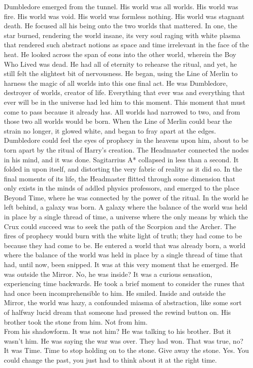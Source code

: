 Dumbledore emerged from the tunnel. His world was all worlds. His world was fire. His world was void. His world was formless nothing. His world was stagnant death. He focused all his being onto the two worlds that mattered. In one, the star burned, rendering the world insane, its very soul raging with white plasma that rendered such abstract notions as space and time irrelevant in the face of the heat.
\SmallVSpace
He looked across the span of eons into the other world, wherein the Boy Who Lived was dead.
\SmallVSpace
He had all of eternity to rehearse the ritual, and yet, he still felt the slightest bit of nervousness. He began, using the Line of Merlin to harness the magic of all worlds into this one final act. He was Dumbledore, destroyer of worlds, creator of life. Everything that ever was and everything that ever will be in the universe had led him to this moment. This moment that must come to pass because it already has.
\SomeVSpace
All worlds had narrowed to two, and from those two all worlds would be born. When the Line of Merlin could bear the strain no longer, it glowed white, and began to fray apart at the edges. Dumbledore could feel the eyes of prophecy in the heavens upon him, about to be torn apart by the ritual of Harry’s creation. The Headmaster connected the nodes in his mind, and it was done.
\SmallVSpace
Sagitarrius A* collapsed in less than a second. It folded in upon itself, and distorting the very fabric of reality as it did so. In the final moments of its life, the Headmaster flitted through some dimension that only exists in the minds of addled physics professors, and emerged to the place Beyond Time, where he was connected by the power of the ritual.
\SmallVSpace
In the world he left behind, a galaxy was born. A galaxy where the balance of the world was held in place by a single thread of time, a universe where the only means by which the Crux could succeed was to seek the path of the Scorpion and the Archer. The fires of prophecy would burn with the white light of truth; they had come to be because they had come to be.
\SmallVSpace
He entered a world that was already born, a world where the balance of the world was held in place by a single thread of time that had, until now, been snipped. It was at this very moment that he emerged. He was outside the Mirror. No, he was inside? It was a curious sensation, experiencing time backwards. He took a brief moment to consider the runes that had once been incomprehensible to him. He smiled.
\SmallVSpace
Inside and outside the Mirror, the world was hazy, a confounded miasma of abstraction, like some sort of halfway lucid dream that someone had pressed the rewind button on. His brother took the stone from him. Not from him.\\From his shadowform. It was not him?  He was talking to his brother. But it wasn’t him. He was saying the war was over. They had won. That was true, no? It was Time. Time to stop holding on to the stone. Give away the stone. Yes.
\SmallVSpace
You could change the past, you just had to think about it at the right time.

